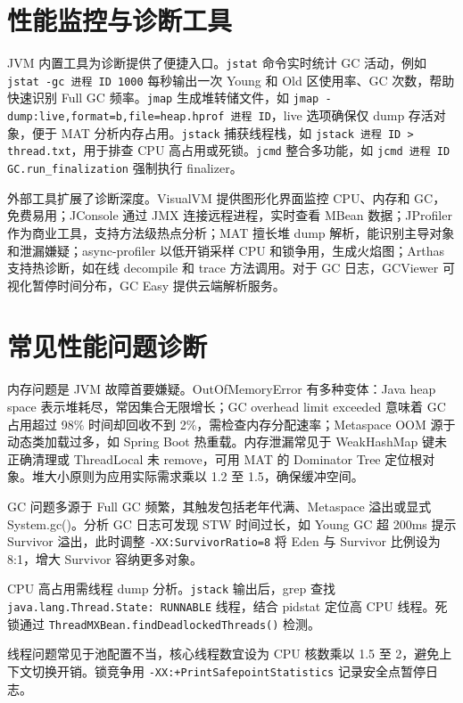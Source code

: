 \chapter{性能监控与诊断工具}
JVM 内置工具为诊断提供了便捷入口。\texttt{jstat} 命令实时统计 GC 活动，例如 \texttt{jstat -gc 进程 ID 1000} 每秒输出一次 Young 和 Old 区使用率、GC 次数，帮助快速识别 Full GC 频率。\texttt{jmap} 生成堆转储文件，如 \texttt{jmap -dump:live,format=b,file=heap.hprof 进程 ID}，live 选项确保仅 dump 存活对象，便于 MAT 分析内存占用。\texttt{jstack} 捕获线程栈，如 \texttt{jstack 进程 ID > thread.txt}，用于排查 CPU 高占用或死锁。\texttt{jcmd} 整合多功能，如 \texttt{jcmd 进程 ID GC.run\_{}finalization} 强制执行 finalizer。\par
外部工具扩展了诊断深度。VisualVM 提供图形化界面监控 CPU、内存和 GC，免费易用；JConsole 通过 JMX 连接远程进程，实时查看 MBean 数据；JProfiler 作为商业工具，支持方法级热点分析；MAT 擅长堆 dump 解析，能识别主导对象和泄漏嫌疑；async-profiler 以低开销采样 CPU 和锁争用，生成火焰图；Arthas 支持热诊断，如在线 decompile 和 trace 方法调用。对于 GC 日志，GCViewer 可视化暂停时间分布，GC Easy 提供云端解析服务。\par
\chapter{常见性能问题诊断}
内存问题是 JVM 故障首要嫌疑。OutOfMemoryError 有多种变体：Java heap space 表示堆耗尽，常因集合无限增长；GC overhead limit exceeded 意味着 GC 占用超过 98\%{} 时间却回收不到 2\%{}，需检查内存分配速率；Metaspace OOM 源于动态类加载过多，如 Spring Boot 热重载。内存泄漏常见于 WeakHashMap 键未正确清理或 ThreadLocal 未 remove，可用 MAT 的 Dominator Tree 定位根对象。堆大小原则为应用实际需求乘以 1.2 至 1.5，确保缓冲空间。\par
GC 问题多源于 Full GC 频繁，其触发包括老年代满、Metaspace 溢出或显式 System.gc()。分析 GC 日志可发现 STW 时间过长，如 Young GC 超 200ms 提示 Survivor 溢出，此时调整 \texttt{-XX:SurvivorRatio=8} 将 Eden 与 Survivor 比例设为 8:1，增大 Survivor 容纳更多对象。\par
CPU 高占用需线程 dump 分析。\texttt{jstack} 输出后，grep 查找 \texttt{java.lang.Thread.State: RUNNABLE} 线程，结合 pidstat 定位高 CPU 线程。死锁通过 \texttt{ThreadMXBean.findDeadlockedThreads()} 检测。\par
线程问题常见于池配置不当，核心线程数宜设为 CPU 核数乘以 1.5 至 2，避免上下文切换开销。锁竞争用 \texttt{-XX:+PrintSafepointStatistics} 记录安全点暂停日志。\par
